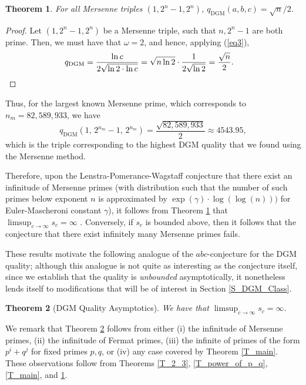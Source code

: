 \documentclass[11pt,letterpaper]{amsart}
\newtheorem{theorem}{Theorem}[section]
\def\ra{\rightarrow}
\begin{document}
\begin{theorem}\label{T_3_4}
For all Mersenne triples $(1,2^n-1,2^n)$, $q_{\mathrm{DGM}}(a,b,c)=\sqrt{n}/2$.
\end{theorem}
\begin{proof}
Let $(1, 2^{n} - 1, 2^n)$ be a Mersenne triple, such that $n, 2^{n} - 1$ are both prime. Then, we must have that $\omega = 2$, and hence, applying (\ref{eq3}),
\begin{align*}
q_{\mathrm{DGM}} = \frac{\ln c}{2\sqrt{\ln 2\cdot\ln c}}
&=\sqrt{n\ln 2}\cdot\frac{1}{2\sqrt{\ln 2}}=\frac{\sqrt{n}}{2}. \qedhere %
\end{align*}
\end{proof}
Thus, for the largest known Mersenne prime, which corresponds to $n_m=82{,}589{,}933$, we have
\[
    q_{\mathrm{DGM}}(1,\,2^{n_m}-1,\,2^{n_m}) = \frac{\sqrt{82{,}589{,}933}}{2} \approx 4543.95,
\]
which is the triple corresponding to the highest DGM quality that we found using the Mersenne method.

Therefore, upon the Lenstra-Pomerance-Wagstaff conjecture that there exist an infinitude of Mersenne primes (with distribution such that the number of such primes below exponent $n$ is approximated by $\exp(\gamma) \cdot \log(\log(n)))$ for Euler-Mascheroni constant $\gamma$), it follows from Theorem \ref{T_3_4} that $\limsup_{c \ra \infty} s_c = \infty$ \cite{pomerance1981}. Conversely, if $s_c$ is bounded above, then it follows that the conjecture that there exist infinitely many Mersenne primes fails.

These results motivate the following analogue of the $abc$-conjecture for the DGM quality; although this analogue is not quite as interesting as the conjecture itself, since we establish that the quality is \textit{unbounded} asymptotically, it nonetheless lends itself to modifications that will be of interest in Section \ref{S_DGM_Class}.

\begin{theorem}[DGM Quality Asymptotics]\label{C_abc_DGM}
We have that $\limsup_{c\to\infty} s_c = \infty$.
\end{theorem}
We remark that Theorem \ref{C_abc_DGM} follows from either (i) the infinitude of Mersenne primes, (ii) the infinitude of Fermat primes, (iii) the infinite of primes of the form $p^i+q^j$ for fixed primes $p,q$, or (iv) any case covered by Theorem \ref{T_main}. These observations follow from Theorems \ref{T_2_3}, \ref{T_power_of_p_q}, \ref{T_main}, and \ref{T_3_4}.
\end{document}

